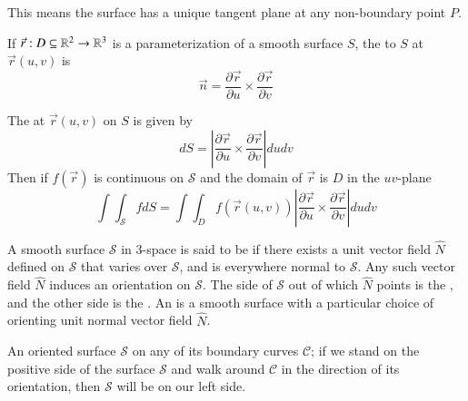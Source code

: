 \documentclass[12pt, a4paper, oneside, openright, titlepage]{book}
\begin{document}
\begin{appendices}
    \begin{rmk}
        This means the surface has a unique tangent plane at any non-boundary point $P$.
    \end{rmk}
    
    \begin{defn}
        If $\vec{r}:D\subseteq 
        \mathbb R^2 \rightarrow \mathbb R^3$ is a parameterization of a smooth surface $S$, the  to $S$ at $\vec{r}(u,v)$ is \begin{equation}
            \vec{n} = \frac{\partial \vec{r}}{\partial u}\times \frac{\partial \vec{r}}{\partial v}
        \end{equation}
    \end{defn}
    
    \begin{defn}
        The  at $\vec{r}(u,v)$ on $S$ is given by \begin{equation}
            dS = \left|\frac{\partial \vec{r}}{\partial u}\times \frac{\partial \vec{r}}{\partial v}\right|dudv
        \end{equation}
        Then if $f(\vec{r})$ is continuous on $\mathcal{S}$ and the domain of $\vec{r}$ is $D$ in the $uv$-plane \begin{equation}
            \int\int_{\mathcal{S}}fdS = \int\int_{D}f(\vec{r}(u,v)) \left|\frac{\partial \vec{r}}{\partial u}\times \frac{\partial \vec{r}}{\partial v}\right|dudv
        \end{equation}
    \end{defn}
    
    \begin{defn}
        A smooth surface $\mathcal{S}$ in $3$-space is said to be  if there exists a unit vector field $\hat{N}$ defined on $\mathcal{S}$ that varies  over $\mathcal{S}$, and is everywhere normal to $\mathcal{S}$. Any such vector field $\hat{N}$ induces an orientation on $\mathcal{S}$. The side of $\mathcal{S}$ out of which $\hat{N}$ points is the , and the other side is the . An  is a smooth surface with a particular choice of orienting unit normal vector field $\hat{N}$.
    \end{defn}
    
    \begin{rmk}
        An oriented surface $\mathcal{S}$  on any of its boundary curves $\mathcal{C}$; if we stand on the positive side of the surface $\mathcal{S}$ and walk around $\mathcal{C}$ in the direction of its orientation, then $\mathcal{S}$ will be on our left side.
    \end{rmk}
    

\end{appendices}
\end{document}
